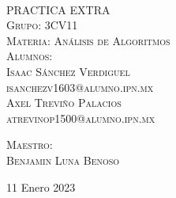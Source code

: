 \begin{titlepage}
\begin{minipage}[c][0.81\textheight][t]{0.25\textwidth}
\begin{center}
    \end{center}
  \end{minipage}
  \begin{minipage}[c][0.81\textheight][t]{0.75\textwidth}
    \begin{center}
      \vspace{1cm}

      {\color{black}{\large\scshape Semestre 2023-1}}\\[.2in]

      \vspace{0.5cm}            

      \textsc{\LARGE PRACTICA EXTRA}\\[1.5cm]
      \textsc{\large Grupo: 3CV11}\\[0.5cm]
      \textsc{\large Materia: Análisis de Algoritmos}\\[0.5cm]
      
      {\color{black}\textsc{\large Alumnos:}}\\[0.5cm]
      \textsc{\large {Isaac Sánchez Verdiguel}}\\[1cm]
      \textsc{ {isanchezv1603@alumno.ipn.mx}}\\[1cm]   
      \textsc{\large {Axel Treviño Palacios}}\\[1cm]
      \textsc{ {atrevinop1500@alumno.ipn.mx}}\\[1cm]   
      
      
      
      \vspace{0.5cm}

      {\large\scshape 
        {\color{black}Maestro:}\\[0.3cm] {Benjamin Luna Benoso}}\\[.2in]

      \vspace{0.5cm}
       
      \large{11 Enero 2023}
    \end{center}
  \end{minipage}
\end{titlepage}
